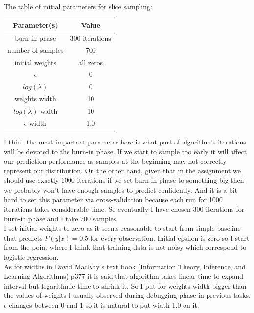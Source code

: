 \documentclass{article}
\begin{document}
\begin{enumerate}[label=(\alph*)]
						The table of initial parameters for slice sampling:
							\begin{center}
								\begin{tabular}{| c | c |}
									\hline
									Parameter(s) & Value\\
									\hline
									burn-in phase & 300 iterations \\
									\hline
									number of samples & 700 \\
									\hline
									initial weights & all zeros \\
									\hline
									$\epsilon$ & 0 \\
									\hline
									$log(\lambda)$ & 0 \\
									\hline
									weights width &  10 \\
									\hline
									$log(\lambda)$ width & 10 \\
									\hline
									$\epsilon$ width & 1.0 \\
									\hline
								\end{tabular}
							\end{center}
							I think the most important parameter here is what part of algorithm's iterations will be devoted to the burn-in phase. If we start to sample too early it will affect our prediction performance as samples at the beginning may not correctly represent our distribution. On the other hand, given that in the assignment we should use exactly 1000 iterations if we set burn-in phase to something big then we probably won't have enough samples to predict confidently. And it is a bit hard to set this parameter via cross-validation because each run for 1000 iterations takes considerable time. So eventually I have chosen 300 iterations for burn-in phase and I take 700 samples. \\
							I set initial weights to zero as it seems reasonable to start from simple baseline  that predicts $P(y | x) =0.5$ for every observation. Initial epsilon is zero so I start from the point where I think that training data is not noisy which correspond to logistic regression.\\
							As for widths in David MacKay's text book (Information Theory, Inference, and Learning Algorithms) p377 it is said that algorithm takes linear time to expand interval but logarithmic time to shrink it. So I put for weights width bigger than the values of weights I usually observed during debugging phase in previous tasks. $\epsilon$ changes between 0 and 1 so it is natural to put width 1.0 on it.\\

\end{enumerate}
\end{document}
